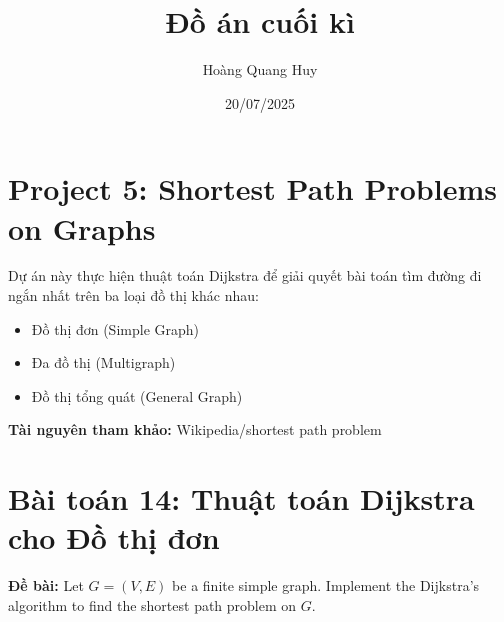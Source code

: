 \documentclass[12pt,a4paper]{article}
\title{Đồ án cuối kì}
\author{Hoàng Quang Huy}
\date{20/07/2025}
\begin{document}
\maketitle

\section{Project 5: Shortest Path Problems on Graphs}

Dự án này thực hiện thuật toán Dijkstra để giải quyết bài toán tìm đường đi ngắn nhất trên ba loại đồ thị khác nhau:
\begin{itemize}
\item Đồ thị đơn (Simple Graph)
\item Đa đồ thị (Multigraph) 
\item Đồ thị tổng quát (General Graph)
\end{itemize}

\textbf{Tài nguyên tham khảo:} Wikipedia/shortest path problem

\section{Bài toán 14: Thuật toán Dijkstra cho Đồ thị đơn}

\textbf{Đề bài:} Let $G = (V, E)$ be a finite simple graph. Implement the Dijkstra's algorithm to find the shortest path problem on $G$.
\end{document}
